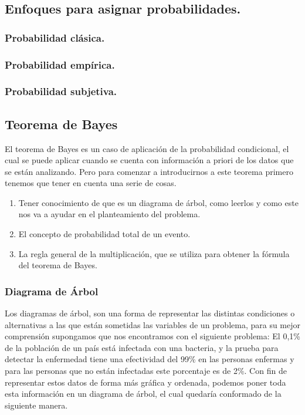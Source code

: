 \documentclass[]{article}
\begin{document}
\subsection{Enfoques para asignar probabilidades.}
\subsubsection*{Probabilidad clásica.}
\subsubsection*{Probabilidad empírica.}
\subsubsection*{Probabilidad subjetiva.}

\subsection{Teorema de Bayes}
El teorema de Bayes es un caso de aplicación de la probabilidad condicional, el cual se puede aplicar cuando se cuenta con información a priori de los datos que se están analizando. Pero para comenzar a introducirnos a este teorema primero tenemos que tener en cuenta una serie de cosas.
\begin{enumerate}
	\item Tener conocimiento de que es un diagrama de árbol, como leerlos y como este nos va a ayudar en el planteamiento del problema.
	\item El concepto de probabilidad total de un evento.
	\item La regla general de la multiplicación, que se utiliza para obtener la fórmula del teorema de Bayes.
\end{enumerate}
\subsubsection*{Diagrama de Árbol}
Los diagramas de árbol, son una forma de representar las distintas condiciones o alternativas a las que están sometidas las variables de un problema, para su mejor comprensión supongamos que nos encontramos con el siguiente problema:
El 0,1\% de la población de un país está infectada con una bacteria, y la prueba para detectar la enfermedad tiene una efectividad del 99\% en las personas enfermas y para las personas que no están infectadas este porcentaje es de 2\%.
Con fin de representar estos datos de forma más gráfica y ordenada, podemos poner toda esta información en un diagrama de árbol, el cual quedaría conformado de la siguiente manera.
\end{document}
